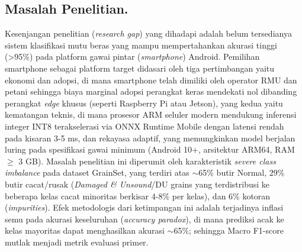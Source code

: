 \documentclass[12pt,a4paper]{article}
\begin{document}
\begin{table}[htbp]
\centering
\small
\caption{Perbandingan Metrik Arsitektur Baseline dan Model Kandidat Ringan}
\label{tab:model_comparison}
\end{table}

\subsection*{Masalah Penelitian.} 

\indent Kesenjangan penelitian (\textit{research gap}) yang dihadapi adalah belum tersedianya sistem klasifikasi mutu beras yang mampu mempertahankan akurasi tinggi
(>95\%) pada platform gawai pintar (\textit{smartphone}) Android. Pemilihan smartphone sebagai platform target didasari oleh tiga pertimbangan yaitu 
ekonomi dan adopsi, di mana smartphone telah dimiliki oleh operator RMU dan petani sehingga biaya marginal adopsi perangkat keras 
mendekati nol dibanding perangkat \textit{edge} khusus (seperti Raspberry Pi atau Jetson), yang kedua yaitu kematangan teknis, di mana prosesor
ARM seluler modern mendukung inferensi integer INT8 terakselerasi via ONNX Runtime Mobile dengan latensi rendah pada kisaran 3-5 ms, dan 
rekayasa adaptif, yang memungkinkan model berjalan luring pada spesifikasi gawai minimum (Android 10+, arsitektur ARM64, RAM $\ge$ 3 GB). 
Masalah penelitian ini diperumit oleh karakteristik \textit{severe class imbalance} pada dataset GrainSet, yang terdiri atas $\sim$65\% butir Normal,
29\% butir cacat/rusak (\textit{Damaged \& Unsound}/DU grains yang terdistribusi ke beberapa kelas cacat minoritas berkisar 4-8\% per kelas), 
dan 6\% kotoran (\textit{impurities}). Efek metodologis dari ketimpangan ini adalah terjadinya inflasi semu pada akurasi keseluruhan (\textit{accuracy paradox}),
di mana prediksi acak ke kelas mayoritas dapat menghasilkan akurasi $\sim$65\%; sehingga Macro F1-score mutlak menjadi metrik evaluasi primer.
\end{document}
